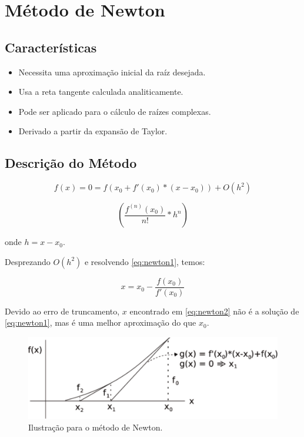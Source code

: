 \section{Método de Newton}

\subsection{Características}

\begin{itemize}
 \item Necessita uma aproximação inicial da raíz desejada.
 \item Usa a reta tangente calculada analiticamente.
 \item Pode ser aplicado para o cálculo de raízes complexas.
 \item Derivado a partir da expansão de Taylor.
\end{itemize}

\subsection{Descrição do Método}

\begin{equation}
 \label{eq:newton1}
 f(x) = 0 = f(x_{0} + f'(x_{0}) \ast (x - x_{0})) + O(h^{2})
\end{equation}

\[
 \displaystyle \left( \frac{f^{(n)}(x_{0})}{n!} \ast h^{n} \right)
\]

onde $h = x - x_{0}$.

Desprezando $O(h^{2})$ e resolvendo \ref{eq:newton1}, temos:

\begin{equation}
 \label{eq:newton2}
 x = x_{0} - \frac{f(x_{0})}{f'(x_{0})}
\end{equation}

Devido ao erro de truncamento, $x$ encontrado em \ref{eq:newton2} não é a solução de \ref{eq:newton1}, mas é uma melhor aproximação do que $x_{0}$.

\begin{figure}[htb]
  \setlength{\abovecaptionskip}{20pt}
  \centering
  \includegraphics[scale=0.8]{capitulos/capitulo1/figuras/newton1-eps-converted-to.pdf}
  \caption{Ilustração para o método de Newton.}
  \label{fig:newton1}
\end{figure}

